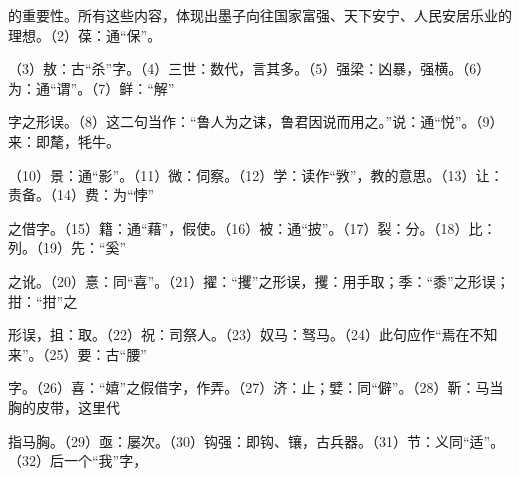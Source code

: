 \documentclass[12pt,UTF8]{ctexbook}
\begin{document}
的重要性。所有这些内容，体现出墨子向往国家富强、天下安宁、人民安居乐业的理想。（2）葆：通“保”。 

（3）敖：古“杀”字。（4）三世：数代，言其多。（5）强梁：凶暴，强横。（6）为：通“谓”。（7）鲜：“解” 

字之形误。（8）这二句当作：“鲁人为之诔，鲁君因说而用之。”说：通“悦”。（9）来：即氂，牦牛。 

（10）景：通“影”。（11）微：伺察。（12）学：读作“敩”，教的意思。（13）让：责备。（14）费：为“悖” 

之借字。（15）籍：通“藉”，假使。（16）被：通“披”。（17）裂：分。（18）比：列。（19）先：“奚” 

之讹。（20）憙：同“喜”。（21）擢：“攫”之形误，攫：用手取；季：“黍”之形误；拑：“拑”之 

形误，抯：取。（22）祝：司祭人。（23）奴马：驽马。（24）此句应作“焉在不知来”。（25）要：古“腰” 

字。（26）喜：“嬉”之假借字，作弄。（27）济：止；嬖：同“僻”。（28）靳：马当胸的皮带，这里代 

指马胸。（29）亟：屡次。（30）钩强：即钩、镶，古兵器。（31）节：义同“适”。（32）后一个“我”字， 
\end{document}
